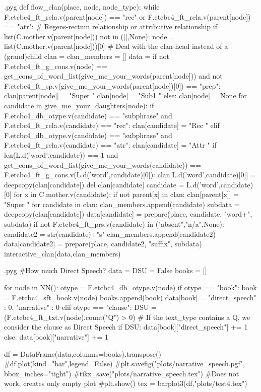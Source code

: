 \documentclass{report}
\makeatletter
\newenvironment{python}{%
  \VerbatimEnvironment
  \minted@resetoptions
  \setkeys{minted@opt}{}
      \begin{VerbatimOut}{\jobname.pyg}}
{%
      \end{VerbatimOut}
      \minted@pygmentize{python}
      \DeleteFile{\jobname.pyg}}
\makeatother
\begin{document}
\begin{python}
def flow_clan(place, node, node_type):
    while F.etcbc4_ft_rela.v(parent[node]) == "rec" or F.etcbc4_ft_rela.v(parent[node]) == "atr": # Regens-rectum relationship or attributive relationship
        if list(C.mother.v(parent[node])) not in ([],None):
            node = list(C.mother.v(parent[node]))[0] # Deal with the clan-head instead of a (grand)child
    clan = {}
    clan_members = []
    data = {}
    if not F.etcbc4_ft_g_cons.v(node) == get_cons_of_word_list(give_me_your_words(parent[node])) and not F.etcbc4_ft_sp.v(give_me_your_words(parent[node])[0]) == "prep":
        clan[parent[node]] = "Super "
        clan[node] = "Sub1 "
    else:
        clan[node] = None
    for candidate in give_me_your_daughters(node):
        if F.etcbc4_db_otype.v(candidate) == "subphrase" and F.etcbc4_ft_rela.v(candidate) == "rec":
            clan[candidate] = "Rec "
        elif F.etcbc4_db_otype.v(candidate) == "subphrase" and F.etcbc4_ft_rela.v(candidate) == "atr":
            clan[candidate] = "Attr "
        if len(L.d('word',candidate)) == 1 and get_cons_of_word_list(give_me_your_words(candidate)) == F.etcbc4_ft_g_cons.v(L.d('word',candidate)[0]):
            clan[L.d('word',candidate)[0]] = deepcopy(clan[candidate])
            del clan[candidate]
            candidate = L.d('word',candidate)[0] 
        for x in C.mother.v(candidate):
            if not parent[x] in clan:
                clan[parent[x]] = "Super "
    for candidate in clan:
        clan_members.append(candidate)
        subdata = deepcopy(clan[candidate])
        data[candidate] = prepare(place, candidate, "word+", subdata)
        if not F.etcbc4_ft_prs.v(candidate) in ("absent","n/a",None):
            candidate2 = str(candidate)+"s"
            clan_members.append(candidate2)
            data[candidate2] = prepare(place, candidate2, "suffix", subdata)
    interactive_clan(data,clan_members)

\end{python}
\begin{python}
#How much Direct Speech?
data = {}
DSU = False
books = []

for node in NN():
    otype = F.etcbc4_db_otype.v(node)
    if otype == "book":
        book = F.etcbc4_sft_book.v(node)
        books.append(book)
        data[book] = {"direct_speech" : 0, "narrative" : 0}
    elif otype == "clause":
        DSU = (F.etcbc4_ft_txt.v(node).count("Q") > 0)    # If the text_type contains a Q, we consider the clause as Direct Speech
        if DSU:
            data[book]["direct_speech"] += 1
        else:
            data[book]["narrative"] += 1

df = DataFrame(data,columns=books).transpose()
#df.plot(kind="bar",legend=False)
#plt.savefig("plots/narrative_speech.pgf", bbox_inches="tight")
#tikz_save("plots/narrative_speech.tex") #Does not work, creates only empty plot
#plt.show()
tex = barplot3(df,"plots/test4.tex")

\end{python}
\end{document}
